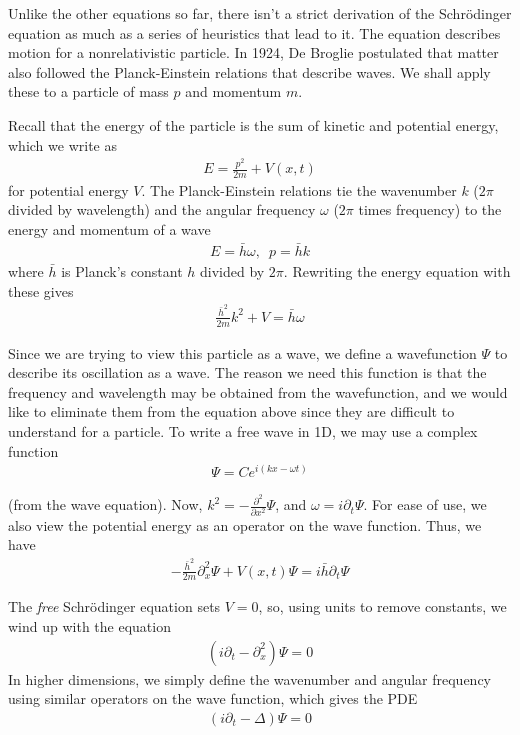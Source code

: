 \documentclass{article}
\newcommand{\pd}{\partial}
\begin{document}
	Unlike the other equations so far, there isn't a strict derivation of the Schr{\"o}dinger equation as much as a series of heuristics that lead to it. The equation describes motion for a nonrelativistic particle. In 1924, De Broglie postulated that matter also followed the Planck-Einstein relations that describe waves. We shall apply these to a particle of mass $p$ and momentum $m$. 
	
	Recall that the energy of the particle is the sum of kinetic and potential energy, which we write as 
	\begin{align*}
		E = \frac{p^{2}}{2m} + V(x,t)
	\end{align*}
	for potential energy $V$. The Planck-Einstein relations tie the wavenumber $k$ ($2\pi$ divided by wavelength) and the angular frequency $\omega$ ($2\pi$ times frequency) to the energy and momentum of a wave 
	\begin{align*}
		E = \bar{h} \omega, \,\,\, p = \bar{h}k
	\end{align*}
	where $\bar{h}$ is Planck's constant $h$ divided by $2\pi$. Rewriting the energy equation with these gives
	\begin{align*}
		\frac{\bar{h}^{2}}{2m} k^{2} + V = \bar{h}\omega
	\end{align*}
	
	Since we are trying to view this particle as a wave, we define a wavefunction $\Psi$ to describe its oscillation as a wave. The reason we need this function is that the frequency and wavelength may be obtained from the wavefunction, and we would like to eliminate them from the equation above since they are difficult to understand for a particle. To write a free wave in 1D, we may use a complex function 
	\begin{align*}
		\Psi = C e^{i(kx - \omega t)}
	\end{align*}
	
	(from the wave equation). Now, $k^{2} = - \frac{\pd^{2}}{\pd x^{2}} \Psi$, and $\omega = i \pd_{t} \Psi$. For ease of use, we also view the potential energy as an operator on the wave function. Thus, we have 
	\begin{align*}
		-\frac{\bar{h}^{2}}{2m} \pd_{x}^{2} \Psi + V(x,t)\Psi = i \bar{h} \pd_{t} \Psi
	\end{align*}
	
	The \textit{free} Schr{\"o}dinger equation sets $V=0$, so, using units to remove constants, we wind up with the equation 
	\begin{align*}
		(i \pd_{t} - \pd_{x}^{2}) \Psi = 0
	\end{align*}
	In higher dimensions, we simply define the wavenumber and angular frequency using similar operators on the wave function, which gives the PDE
	\begin{align*}
		(i \pd_{t} - \Delta ) \Psi = 0
	\end{align*}
	
\end{document}
